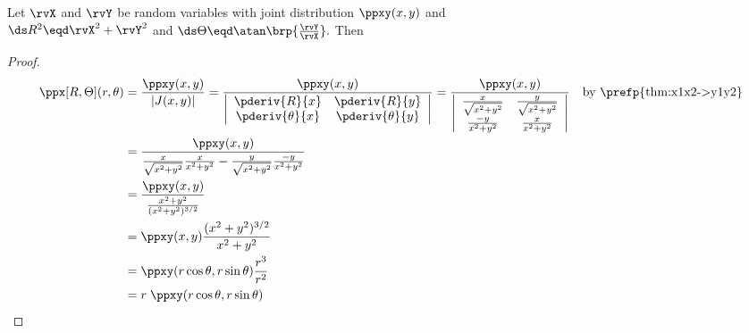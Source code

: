 \begin{proposition}
\label{prop:XY->RT}
Let $\rvX$ and $\rvY$ be random variables with joint distribution $\ppxy(x,y)$ and
\\$\ds R^2 \eqd \rvX^2 + \rvY^2$ and $\ds\Theta \eqd \atan\brp{\frac{\rvY}{\rvX}}.$
\quad Then
\end{proposition}
\begin{proof}
\begin{align*}
  \ppx[R,\Theta](r,\theta)
    &= \frac{\ppxy(x,y)}{|J(x,y)|}
     =  \frac{\ppxy(x,y)}{
        \left|\begin{array}{cc}
          \pderiv{R}{x}      & \pderiv{R}{y}   \\
          \pderiv{\theta}{x} & \pderiv{\theta}{y}
        \end{array}\right|
        }
     =  \frac{\ppxy(x,y)}{
        \left|\begin{array}{cc}
          \frac{ x}{\sqrt{x^2+y^2}}  & \frac{y}{\sqrt{x^2+y^2}}   \\
          \frac{-y}{x^2+y^2}         & \frac{x}{x^2+y^2}
        \end{array}\right|
        }
    && \text{by \prefp{thm:x1x2->y1y2}}
  \\&= \frac{\ppxy(x,y)}{
         \frac{x}{\sqrt{x^2+y^2}}\frac{x}{x^2+y^2}  -
         \frac{y}{\sqrt{x^2+y^2}}\frac{-y}{x^2+y^2}
       }
  \\&= \frac{\ppxy(x,y)}{
         \frac{x^2+y^2}{(x^2+y^2)^{3/2}}
       }
  \\&= \ppxy(x,y)\frac{(x^2+y^2)^{3/2}}{x^2+y^2}
  \\&= \ppxy(r\cos\theta,r\sin\theta)\frac{r^3}{r^2}
  \\&= r\;\ppxy(r\cos\theta,r\sin\theta)
\end{align*}
\end{proof}



